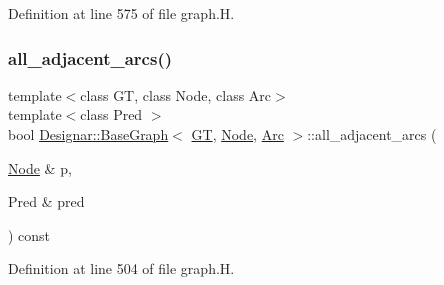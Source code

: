 Definition at line 575 of file graph.\+H.

\mbox{\label{class_designar_1_1_base_graph_af7a57a1088105a79466546620bf830b3}} 
\subsubsection{\texorpdfstring{all\+\_\+adjacent\+\_\+arcs()}{all\_adjacent\_arcs()}\hspace{0.1cm}{\footnotesize\ttfamily [1/2]}}
{\footnotesize\ttfamily template$<$class GT, class Node, class Arc$>$ \\
template$<$class Pred $>$ \\
bool \hyperlink{class_designar_1_1_base_graph}{Designar\+::\+Base\+Graph}$<$ \hyperlink{demo-buildgraph_8_c_a3001c40d2c31ca87ed96cd7d1334a55e}{GT}, \hyperlink{namespace_designar_a5af326c65aa2bd26b26c410f2030d09e}{Node}, \hyperlink{namespace_designar_a3f55fb5513d62ff47cbc8f72b8e95d6f}{Arc} $>$\+::all\+\_\+adjacent\+\_\+arcs (\begin{DoxyParamCaption}\item[{\hyperlink{namespace_designar_a5af326c65aa2bd26b26c410f2030d09e}{Node} \&}]{p,  }\item[{Pred \&}]{pred }\end{DoxyParamCaption}) const\hspace{0.3cm}{\ttfamily [inline]}}



Definition at line 504 of file graph.\+H.

\mbox{\label{class_designar_1_1_base_graph_aaae4400215b8ea6b55941875981c3892}} 

